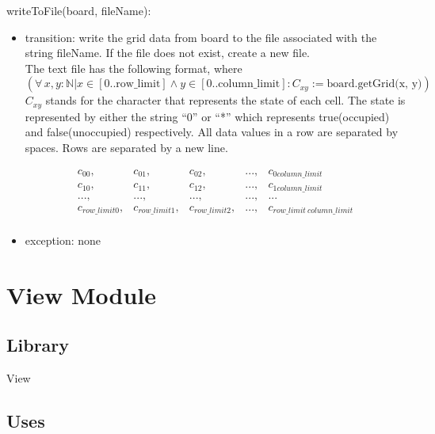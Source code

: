 \documentclass[12pt]{article}
\begin{document}
\noindent writeToFile(board, fileName):
\begin{itemize}
\item transition: write the grid data from board to the file associated with the string fileName. If the file does not exist, create a new file.\\

  The text file has the following format, where $(\forall\, x, y: \mathbb{N} | x \in [0..\text{row\_limit}] \wedge y \in [0..\text{column\_limit}]: C_{xy} :=  \text{board.getGrid(x, y)})$ $C_{xy}$ stands for the character that represents the state of each cell. The state is
 represented by either the string ``0'' or ``*'' which represents true(occupied) and false(unoccupied) respectively. All data values in a row are separated by spaces.  Rows are
  separated by a new line.  

  \begin{equation}
    \begin{array}{ccccccc}
      c_{00}, & c_{01}, & c_{02}, &..., & c_{0column\_limit} \\
      c_{10}, & c_{11}, & c_{12}, &..., & c_{1column\_limit} \\
      ..., & ..., & ..., & ..., & ... \\
      c_{row\_limit0}, & c_{row\_limit1}, & c_{row\_limit2}, &..., & c_{row\_limit\ column\_limit} \\
    \end{array}
  \end{equation}


\item exception: none

\end{itemize}



\newpage

\section* {View Module}

\subsection*{Library}

View

\subsection* {Uses}
\end{document}
